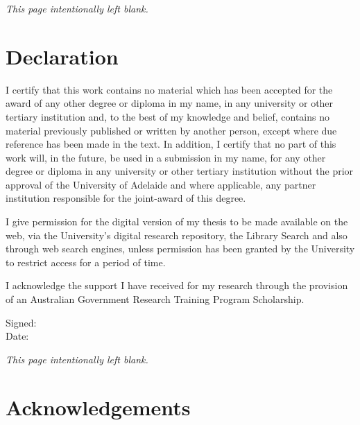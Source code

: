 \documentclass[twoside,12pt,a4paper]{report}
\makeatletter
\newcommand*{\intentionallyblankpage}{
  \vspace*{\fill}
  {\centering \textit{This page intentionally left blank.} \par}
  \vspace{\fill}}
\renewcommand*{\cleardoublepage}{\clearpage\if@twoside \ifodd\c@page\else
  \intentionallyblankpage
  \newpage
  \if@twocolumn\hbox{}\newpage\fi\fi\fi}
\makeatother
\begin{document}
\cleardoublepage
\chapter*{Declaration}

I certify that this work contains no material which has been accepted 
for the award of any other degree or diploma in my name, in any
university or other tertiary institution and, to the best of my knowledge 
and belief, contains no material previously published or written
by another person, except where due reference has been made in the 
text. In addition, I certify that no part of this work will, in the
future, be used in a submission in my name, for any other degree or 
diploma in any university or other tertiary institution without the
prior approval of the University of Adelaide and where applicable, any 
partner institution responsible for the joint-award of this degree.

I give permission for the digital version of my thesis to be made 
available on the web, via the University’s digital research repository,
the Library Search and also through web search engines, unless 
permission has been granted by the University to restrict access for a
period of time.

I acknowledge the support I have received for my research through 
the provision of an Australian Government Research Training
Program Scholarship.


\vspace{2cm}

\begin{flushleft}
Signed:  \\[15 pt]
Date:
\end{flushleft}





\cleardoublepage
\chapter*{Acknowledgements}
\end{document}
